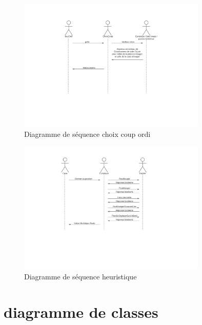 \documentclass[12,french]{report}
\begin{document}
\begin{figure}[H]
	\center
	\includegraphics[width=0.8\textwidth]{./Images/Diagramme_de_sequence1}
	\caption{Diagramme de séquence choix coup ordi}
\end{figure}\vspace{0.2cm}

\begin{figure}[H]
	\center
	\includegraphics[width=0.8\textwidth]{./Images/Diagramme_de_sequence2}
	\caption{Diagramme de séquence heuristique}
\end{figure}\vspace{0.2cm}

\section{diagramme de classes}
\end{document}
